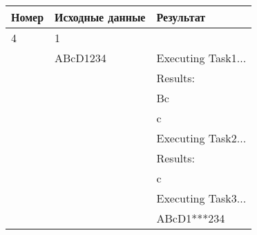 \begin{table}[H]
    \centering
    \begin{tabular}{|l|l|l|}
        \hline
        Номер & Исходные данные & Результат\\[2ex] \hline
        4     & 1               & \\
              & ABcD1234        & Executing Task1...\\
              && Results:\\
              &&Bc\\
              &&c\\
              &&Executing Task2...\\
              &&Results:\\
              &&c\\
              &&Executing Task3...\\
              &&ABcD1***234\\[2ex]\hline
    \end{tabular}
\end{table}
